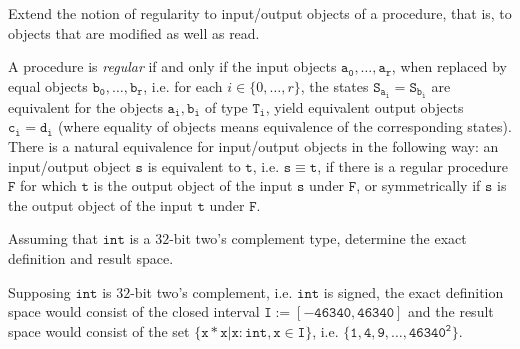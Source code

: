 \begin{Exercise}
    Extend the notion of regularity to input/output objects of a procedure, 
    that is, to objects that are modified as well as read.
\end{Exercise}

\begin{solution}
    A procedure is \textit{regular} if and only if the input objects 
    $\mathtt{a_{0}, \dots, a_{r}}$, when replaced by equal objects 
    $\mathtt{b_{0}, \dots, b_{r}}$, i.e. for each $i \in 
    \{0, \dots, r \}$, the states $\mathtt{S_{a_{i}} = S_{b_{i}}}$ are 
    equivalent for the objects $\mathtt{a_{i}, b_{i}}$ of type 
    $\mathtt{T_i}$, yield equivalent output objects $\mathtt{c_{i} = d_{i}}$ 
    (where equality of objects means equivalence of the corresponding 
    states). There is a natural equivalence for input/output objects 
    in the following way: an input/output object $\mathtt{s}$ is 
    equivalent to $\mathtt{t}$, i.e. $\mathtt{s \equiv t}$, if 
    there is a regular procedure $\mathtt{F}$ for which $\mathtt{t}$ is 
    the output object of the input $\mathtt{s}$ under $\mathtt{F}$, or symmetrically 
    if $\mathtt{s}$ is the output object of the input $\mathtt{t}$ under $\mathtt{F}$.
\end{solution}

\begin{Exercise}
    Assuming that $\mathtt{int}$ is a $32$-bit two's complement type, determine 
    the exact definition and result space.
\end{Exercise}

\begin{solution}
    Supposing $\mathtt{int}$ is $32$-bit two's complement, i.e. $\mathtt{int}$ is 
    signed, the exact definition space would consist of the closed interval 
    $\mathtt{I := [-46340, 46340]}$ and the result space would consist of the set 
    $\{\mathtt{x*x}| \mathtt{x : int, x \in I}\}$, i.e. 
    $\{\mathtt{1, 4, 9, \dots, 46340^2}\}$.
\end{solution}